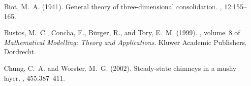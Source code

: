 \documentclass{article}
\begin{document}
\begin{thebibliography}{}

Biot, M.~A. (1941).
\newblock General theory of three-dimensional consolidation.
, 12:155--165.

Bustos, M.~C., Concha, F., B\"{u}rger, R., and Tory, E.~M. (1999).
, volume~8 of {\em Mathematical Modelling: Theory and
  Applications}.
\newblock Kluwer Academic Publishers, Dordrecht.

Chung, C.~A. and Worster, M.~G. (2002).
\newblock Steady-state chimneys in a mushy layer.
, 455:387--411.

\end{thebibliography}
\end{document}
